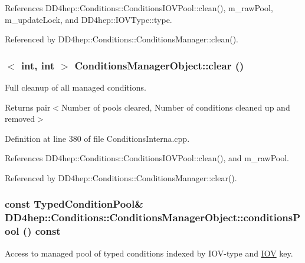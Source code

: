 References DD4hep::Conditions::ConditionsIOVPool::clean(), m\_\-rawPool, m\_\-updateLock, and DD4hep::IOVType::type.

Referenced by DD4hep::Conditions::ConditionsManager::clean().\hypertarget{class_d_d4hep_1_1_conditions_1_1_conditions_manager_object_a16cf2685ed249700904621d9a68bcdb2}{
\subsubsection[{clear}]{$<$ int, int $>$ ConditionsManagerObject::clear ()}}
\label{class_d_d4hep_1_1_conditions_1_1_conditions_manager_object_a16cf2685ed249700904621d9a68bcdb2}


Full cleanup of all managed conditions. \begin{DoxyReturn}{Returns}
pair$<$Number of pools cleared, Number of conditions cleaned up and removed$>$ 
\end{DoxyReturn}


Definition at line 380 of file ConditionsInterna.cpp.

References DD4hep::Conditions::ConditionsIOVPool::clean(), and m\_\-rawPool.

Referenced by DD4hep::Conditions::ConditionsManager::clear().\hypertarget{class_d_d4hep_1_1_conditions_1_1_conditions_manager_object_a216b4a65afcc3533f3b8dd1af996dc8c}{
\subsubsection[{conditionsPool}]{\setlength{\rightskip}{0pt plus 5cm}const {\bf TypedConditionPool}\& DD4hep::Conditions::ConditionsManagerObject::conditionsPool () const}}
\label{class_d_d4hep_1_1_conditions_1_1_conditions_manager_object_a216b4a65afcc3533f3b8dd1af996dc8c}


Access to managed pool of typed conditions indexed by IOV-\/type and \hyperlink{class_d_d4hep_1_1_i_o_v}{IOV} key. 

